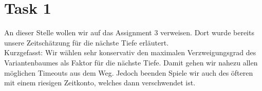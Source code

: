 \section*{Task 1}
An dieser Stelle wollen wir auf das Assignment 3 verweisen. Dort wurde bereits unsere Zeitschätzung für die nächste Tiefe erläutert.\\
Kurzgefasst: Wir wählen sehr konservativ den maximalen Verzweigungsgrad des Variantenbaumes als Faktor für die nächste Tiefe. Damit gehen wir nahezu allen möglichen Timeouts aus dem Weg. Jedoch beenden Spiele wir auch des öfteren mit einem riesigen Zeitkonto, welches dann verschwendet ist.
